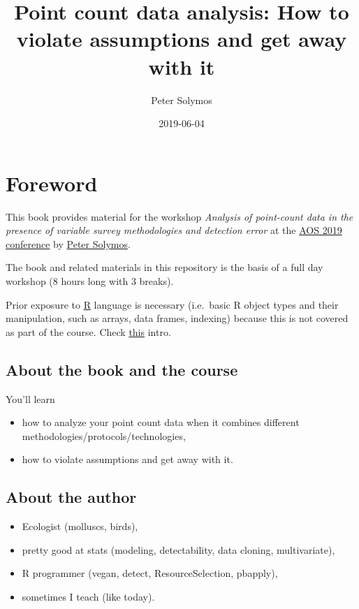 \documentclass[12pt,]{scrbook}
\title{Point count data analysis: How to violate assumptions and get away with it}
\author{Peter Solymos}
\date{2019-06-04}
\providecommand{\tightlist}{%
  \setlength{\itemsep}{0pt}\setlength{\parskip}{0pt}}
\begin{document}
\maketitle

{
\setcounter{tocdepth}{1}
\tableofcontents
}
\listoftables
\listoffigures
\hypertarget{foreword}{%
\chapter{Foreword}\label{foreword}}

This book provides material for the workshop
\emph{Analysis of point-count data in the presence of variable survey methodologies and detection error}
at the \href{https://amornithmeeting.org/}{AOS 2019 conference}
by \href{http://peter.solymos.org}{Peter Solymos}.

The book and related materials in this repository is the basis of a
full day workshop (8 hours long with 3 breaks).

Prior exposure to \href{https://www.r-project.org/}{R} language is necessary
(i.e.~basic R object types and their manipulation, such as arrays, data frames, indexing)
because this is not covered as part of the course.
Check \href{_etc/R-basics.pdf}{this} intro.

\hypertarget{about-the-book-and-the-course}{%
\section{About the book and the course}\label{about-the-book-and-the-course}}

You'll learn

\begin{itemize}
\tightlist
\item
  how to analyze your point count data when it combines different methodologies/protocols/technologies,
\item
  how to violate assumptions and get away with it.
\end{itemize}

\hypertarget{about-the-author}{%
\section{About the author}\label{about-the-author}}

\begin{itemize}
\tightlist
\item
  Ecologist (molluscs, birds),
\item
  pretty good at stats (modeling, detectability, data cloning, multivariate),
\item
  R programmer (vegan, detect, ResourceSelection, pbapply),
\item
  sometimes I teach (like today).
\end{itemize}
\end{document}
